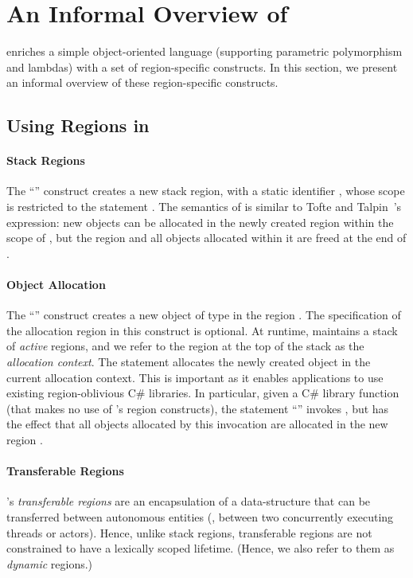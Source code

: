 \newcommand{\COMMENT}[1]{}

\section{An Informal Overview of \name}
\label{sec:overview}

\name enriches a simple object-oriented language (supporting
parametric polymorphism and lambdas) with a set of region-specific constructs. 
In this section, we present an informal overview of these region-specific constructs.

\subsection{Using Regions in \name}

\paragraph{Stack Regions}
The ``'' construct creates a new stack region,
with a static identifier , whose scope is restricted to the
statement . The semantics of   is similar
to Tofte and Talpin~\cite{tofte94}'s  expression:
new objects can be allocated in the newly created region within
the scope of , but the region and all objects allocated within it
are freed at the end of .

\paragraph{Object Allocation}
The ``'' construct creates a new object of type  in
the region . The specification of the allocation region  in
this construct is optional.  At runtime, \name maintains a stack of \emph{active}
regions, and we refer to the region at the top of the stack as the \emph{allocation
context}. The statement  allocates the newly created object in
the current allocation context.
%
This is important as it enables \name applications to use existing
region-oblivious C\# libraries. In particular, given a  C\# library
function  (that makes no use of \name's region constructs), the
statement ``'' invokes , but has the
effect that all objects allocated by this invocation are allocated in
the new region .

\paragraph{Transferable Regions}
\name's \emph{transferable regions} are an encapsulation of a data-structure
that can be transferred between autonomous entities
(\eg, between two concurrently executing threads or actors).
Hence, unlike stack regions, transferable regions are not constrained to have a
lexically scoped lifetime.
(Hence, we also refer to them as \emph{dynamic} regions.)

